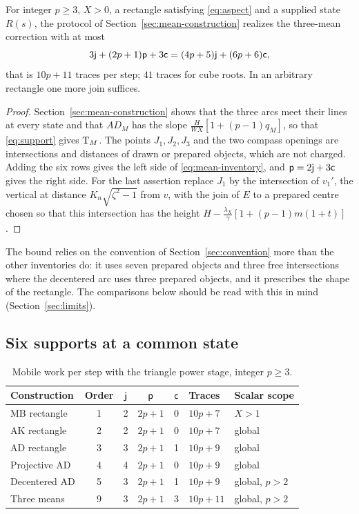 \begin{proposition}\label{prop:mean-inventory}
For integer $p\ge3$, $X>0$, a rectangle satisfying \eqref{eq:aspect} and a supplied state $R(s)$, the
protocol of Section~\ref{sec:mean-construction} realizes the three-mean correction with at most
\begin{equation}\label{eq:mean-inventory}
3\mathsf{j}+(2p+1)\mathsf{p}+3\mathsf{c}=(4p+5)\mathsf{j}+(6p+6)\mathsf{c},
\end{equation}
that is $10p+11$ traces per step; $41$ traces for cube roots. In an arbitrary rectangle one more join
suffices.
\end{proposition}
\begin{proof}
Section~\ref{sec:mean-construction} shows that the three arcs meet their lines at every state and that
$AD_M$ has the slope $\tfrac{H}{WX}[1+(p-1)q_M]$, so that \eqref{eq:support} gives $\mathrm{T}_M$. The points
$J_1,J_2,J_3$ and the two compass openings are intersections and distances of drawn or prepared
objects, which are not charged. Adding the six rows gives the left side of
\eqref{eq:mean-inventory}, and $\mathsf{p}=2\mathsf{j}+3\mathsf{c}$ gives the right side. For the last assertion replace
$J_1$ by the intersection of $v_1'$, the vertical at distance $K_n\sqrt{\zeta^{2}-1}$ from $v$, with
the join of $E$ to a prepared centre chosen so that this intersection has the height
$H-\tfrac{\lambda_X}\gamma[1+(p-1)m(1+t)]$.
\end{proof}

The bound relies on the convention of Section~\ref{sec:convention} more than the other inventories do:
it uses seven prepared objects and three free intersections where the decentered arc uses three
prepared objects, and it prescribes the shape of the rectangle. The comparisons below should be read
with this in mind (Section~\ref{sec:limits}).

\subsection{Six supports at a common state}

\begin{table}[htbp]
\centering\small
\caption{Mobile work per step with the triangle power stage, integer $p\ge3$.}\label{tab:mobile}
\begin{tabular}{@{}lccccll@{}}
\toprule
Construction & Order & $\mathsf{j}$ & $\mathsf{p}$ & $\mathsf{c}$ & Traces & Scalar scope\\
\midrule
MB rectangle & 1 & 2 & $2p+1$ & 0 & $10p+7$ & $X>1$\\
AK rectangle & 2 & 2 & $2p+1$ & 0 & $10p+7$ & global\\
AD rectangle & 3 & 3 & $2p+1$ & 1 & $10p+9$ & global\\
Projective AD & 4 & 4 & $2p+1$ & 0 & $10p+9$ & global\\
Decentered AD & 5 & 3 & $2p+1$ & 1 & $10p+9$ & global, $p>2$\\
Three means & 9 & 3 & $2p+1$ & 3 & $10p+11$ & global, $p>2$\\
\bottomrule
\end{tabular}
\end{table}

